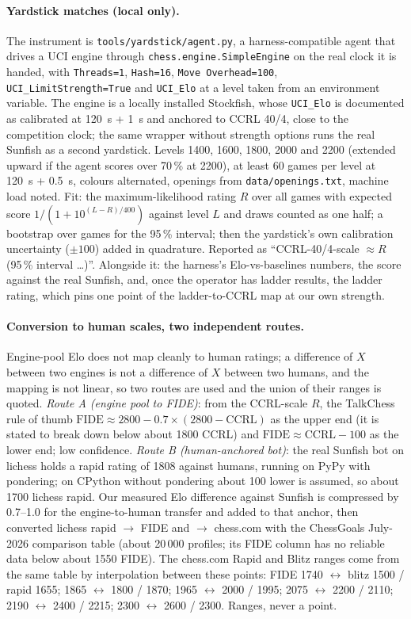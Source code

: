 \documentclass[11pt,a4paper]{article}
\newcommand{\code}[1]{\texttt{#1}}
\begin{document}
\paragraph{Yardstick matches (local only).} The instrument is \code{tools/yardstick/agent.py}, a
harness-compatible agent that drives a UCI engine through \code{chess.engine.SimpleEngine} on the real
clock it is handed, with \code{Threads=1}, \code{Hash=16}, \code{Move Overhead=100},
\code{UCI\_LimitStrength=True} and \code{UCI\_Elo} at a level taken from an environment variable. The
engine is a locally installed Stockfish, whose \code{UCI\_Elo} is documented as calibrated at 120~s + 1~s
and anchored to CCRL 40/4, close to the competition clock; the same wrapper without strength options runs
the real Sunfish as a second yardstick. Levels 1400, 1600, 1800, 2000 and 2200 (extended upward if the
agent scores over 70\,\% at 2200), at least 60 games per level at 120~s + 0.5~s, colours alternated,
openings from \code{data/openings.txt}, machine load noted. Fit: the maximum-likelihood rating $R$ over all
games with expected score $1/(1 + 10^{(L - R)/400})$ against level $L$ and draws counted as one half; a
bootstrap over games for the 95\,\% interval; then the yardstick's own calibration uncertainty ($\pm 100$)
added in quadrature. Reported as ``CCRL-40/4-scale $\approx R$ (95\,\% interval \ldots)''. Alongside it:
the harness's Elo-vs-baselines numbers, the score against the real Sunfish, and, once the operator has
ladder results, the ladder rating, which pins one point of the ladder-to-CCRL map at our own strength.

\paragraph{Conversion to human scales, two independent routes.} Engine-pool Elo does not map cleanly to
human ratings; a difference of $X$ between two engines is not a difference of $X$ between two humans, and
the mapping is not linear, so two routes are used and the union of their ranges is quoted.
\emph{Route A (engine pool to FIDE)}: from the CCRL-scale $R$, the TalkChess rule of thumb
$\mathrm{FIDE} \approx 2800 - 0.7 \times (2800 - \mathrm{CCRL})$ as the upper end (it is stated to break
down below about 1800 CCRL) and $\mathrm{FIDE} \approx \mathrm{CCRL} - 100$ as the lower end; low
confidence. \emph{Route B (human-anchored bot)}: the real Sunfish bot on lichess holds a rapid rating of
1808 against humans, running on PyPy with pondering; on CPython without pondering about 100 lower is
assumed, so about 1700 lichess rapid. Our measured Elo difference against Sunfish is compressed by
0.7--1.0 for the engine-to-human transfer and added to that anchor, then converted lichess rapid $\to$
FIDE and $\to$ chess.com with the ChessGoals July-2026 comparison table (about 20\,000 profiles; its FIDE
column has no reliable data below about 1550 FIDE). The chess.com Rapid and Blitz ranges come from the
same table by interpolation between these points: FIDE 1740 $\leftrightarrow$ blitz 1500 / rapid 1655;
1865 $\leftrightarrow$ 1800 / 1870; 1965 $\leftrightarrow$ 2000 / 1995; 2075 $\leftrightarrow$ 2200 /
2110; 2190 $\leftrightarrow$ 2400 / 2215; 2300 $\leftrightarrow$ 2600 / 2300. Ranges, never a point.
\end{document}
